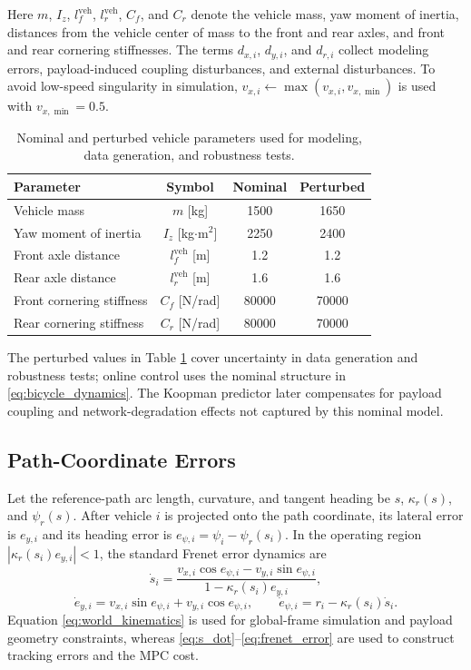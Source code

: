 \documentclass[letterpaper,journal]{IEEEtran}
\begin{document}
\endgroup
Here $m$, $I_z$, $l_f^{\mathrm{veh}}$, $l_r^{\mathrm{veh}}$, $C_f$, and $C_r$ denote the vehicle mass, yaw moment of inertia, distances from the vehicle center of mass to the front and rear axles, and front and rear cornering stiffnesses. The terms $d_{x,i}$, $d_{y,i}$, and $d_{r,i}$ collect modeling errors, payload-induced coupling disturbances, and external disturbances. To avoid low-speed singularity in simulation, $v_{x,i}\leftarrow\max(v_{x,i},v_{x,\min})$ is used with $v_{x,\min}=0.5$.

\begin{table}[!t]
\centering
\caption{Nominal and perturbed vehicle parameters used for modeling, data generation, and robustness tests.}
\label{tab:vehicle_dynamic_params}
\footnotesize
\begin{tabular}{lccc}
\toprule
Parameter & Symbol & Nominal & Perturbed \\
\midrule
Vehicle mass & $m$ [kg] & 1500 & 1650\\
Yaw moment of inertia & $I_z$ [kg$\cdot$m$^2$] & 2250 & 2400\\
Front axle distance & $l_f^{\mathrm{veh}}$ [m] & 1.2 & 1.2\\
Rear axle distance & $l_r^{\mathrm{veh}}$ [m] & 1.6 & 1.6\\
Front cornering stiffness & $C_f$ [N/rad] & 80000 & 70000\\
Rear cornering stiffness & $C_r$ [N/rad] & 80000 & 70000\\
\bottomrule
\end{tabular}
\end{table}

The perturbed values in Table \ref{tab:vehicle_dynamic_params} cover uncertainty in data generation and robustness tests; online control uses the nominal structure in \eqref{eq:bicycle_dynamics}. The Koopman predictor later compensates for payload coupling and network-degradation effects not captured by this nominal model.

\subsection{Path-Coordinate Errors}

Let the reference-path arc length, curvature, and tangent heading be $s$, $\kappa_r(s)$, and $\psi_r(s)$. After vehicle $i$ is projected onto the path coordinate, its lateral error is $e_{y,i}$ and its heading error is $e_{\psi,i}=\psi_i-\psi_r(s_i)$. In the operating region $| \kappa_r(s_i)e_{y,i}|<1$, the standard Frenet error dynamics are
\begin{equation}
\dot s_i=\frac{v_{x,i}\cos e_{\psi,i}-v_{y,i}\sin e_{\psi,i}}
{1-\kappa_r(s_i)e_{y,i}},
\label{eq:s_dot}
\end{equation}
\begin{equation}
\dot e_{y,i}=v_{x,i}\sin e_{\psi,i}+v_{y,i}\cos e_{\psi,i},\qquad
\dot e_{\psi,i}=r_i-\kappa_r(s_i)\dot s_i .
\label{eq:frenet_error}
\end{equation}
Equation \eqref{eq:world_kinematics} is used for global-frame simulation and payload geometry constraints, whereas \eqref{eq:s_dot}--\eqref{eq:frenet_error} are used to construct tracking errors and the MPC cost.
\end{document}
